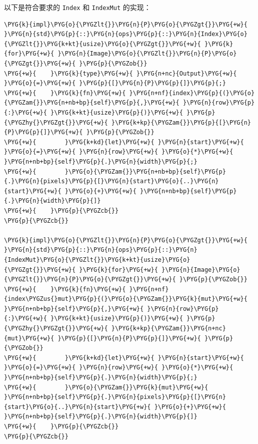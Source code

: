 以下是符合要求的 \texttt{Index} 和 \texttt{IndexMut} 的实现：

\begin{Verbatim}[commandchars=\\\{\},breaklines=true,breakanywhere=true,fontsize=\codefont,xleftmargin=17bp]
\PYG{k}{impl}\PYG{o}{\PYGZlt{}}\PYG{n}{P}\PYG{o}{\PYGZgt{}}\PYG{+w}{ }\PYG{n}{std}\PYG{p}{::}\PYG{n}{ops}\PYG{p}{::}\PYG{n}{Index}\PYG{o}{\PYGZlt{}}\PYG{k+kt}{usize}\PYG{o}{\PYGZgt{}}\PYG{+w}{ }\PYG{k}{for}\PYG{+w}{ }\PYG{n}{Image}\PYG{o}{\PYGZlt{}}\PYG{n}{P}\PYG{o}{\PYGZgt{}}\PYG{+w}{ }\PYG{p}{\PYGZob{}}
\PYG{+w}{    }\PYG{k}{type}\PYG{+w}{ }\PYG{n+nc}{Output}\PYG{+w}{ }\PYG{o}{=}\PYG{+w}{ }\PYG{p}{[}\PYG{n}{P}\PYG{p}{]}\PYG{p}{;}
\PYG{+w}{    }\PYG{k}{fn}\PYG{+w}{ }\PYG{n+nf}{index}\PYG{p}{(}\PYG{o}{\PYGZam{}}\PYG{n+nb+bp}{self}\PYG{p}{,}\PYG{+w}{ }\PYG{n}{row}\PYG{p}{:}\PYG{+w}{ }\PYG{k+kt}{usize}\PYG{p}{)}\PYG{+w}{ }\PYG{p}{\PYGZhy{}\PYGZgt{}}\PYG{+w}{ }\PYG{k+kp}{\PYGZam{}}\PYG{p}{[}\PYG{n}{P}\PYG{p}{]}\PYG{+w}{ }\PYG{p}{\PYGZob{}}
\PYG{+w}{        }\PYG{k+kd}{let}\PYG{+w}{ }\PYG{n}{start}\PYG{+w}{ }\PYG{o}{=}\PYG{+w}{ }\PYG{n}{row}\PYG{+w}{ }\PYG{o}{*}\PYG{+w}{ }\PYG{n+nb+bp}{self}\PYG{p}{.}\PYG{n}{width}\PYG{p}{;}
\PYG{+w}{        }\PYG{o}{\PYGZam{}}\PYG{n+nb+bp}{self}\PYG{p}{.}\PYG{n}{pixels}\PYG{p}{[}\PYG{n}{start}\PYG{o}{..}\PYG{n}{start}\PYG{+w}{ }\PYG{o}{+}\PYG{+w}{ }\PYG{n+nb+bp}{self}\PYG{p}{.}\PYG{n}{width}\PYG{p}{]}
\PYG{+w}{    }\PYG{p}{\PYGZcb{}}
\PYG{p}{\PYGZcb{}}

\PYG{k}{impl}\PYG{o}{\PYGZlt{}}\PYG{n}{P}\PYG{o}{\PYGZgt{}}\PYG{+w}{ }\PYG{n}{std}\PYG{p}{::}\PYG{n}{ops}\PYG{p}{::}\PYG{n}{IndexMut}\PYG{o}{\PYGZlt{}}\PYG{k+kt}{usize}\PYG{o}{\PYGZgt{}}\PYG{+w}{ }\PYG{k}{for}\PYG{+w}{ }\PYG{n}{Image}\PYG{o}{\PYGZlt{}}\PYG{n}{P}\PYG{o}{\PYGZgt{}}\PYG{+w}{ }\PYG{p}{\PYGZob{}}
\PYG{+w}{    }\PYG{k}{fn}\PYG{+w}{ }\PYG{n+nf}{index\PYGZus{}mut}\PYG{p}{(}\PYG{o}{\PYGZam{}}\PYG{k}{mut}\PYG{+w}{ }\PYG{n+nb+bp}{self}\PYG{p}{,}\PYG{+w}{ }\PYG{n}{row}\PYG{p}{:}\PYG{+w}{ }\PYG{k+kt}{usize}\PYG{p}{)}\PYG{+w}{ }\PYG{p}{\PYGZhy{}\PYGZgt{}}\PYG{+w}{ }\PYG{k+kp}{\PYGZam{}}\PYG{n+nc}{mut}\PYG{+w}{ }\PYG{p}{[}\PYG{n}{P}\PYG{p}{]}\PYG{+w}{ }\PYG{p}{\PYGZob{}}
\PYG{+w}{        }\PYG{k+kd}{let}\PYG{+w}{ }\PYG{n}{start}\PYG{+w}{ }\PYG{o}{=}\PYG{+w}{ }\PYG{n}{row}\PYG{+w}{ }\PYG{o}{*}\PYG{+w}{ }\PYG{n+nb+bp}{self}\PYG{p}{.}\PYG{n}{width}\PYG{p}{;}
\PYG{+w}{        }\PYG{o}{\PYGZam{}}\PYG{k}{mut}\PYG{+w}{ }\PYG{n+nb+bp}{self}\PYG{p}{.}\PYG{n}{pixels}\PYG{p}{[}\PYG{n}{start}\PYG{o}{..}\PYG{n}{start}\PYG{+w}{ }\PYG{o}{+}\PYG{+w}{ }\PYG{n+nb+bp}{self}\PYG{p}{.}\PYG{n}{width}\PYG{p}{]}
\PYG{+w}{    }\PYG{p}{\PYGZcb{}}
\PYG{p}{\PYGZcb{}}
\end{Verbatim}

